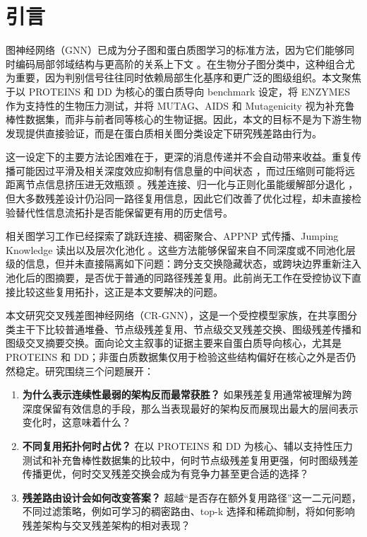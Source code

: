 \section{引言}

图神经网络（GNN）已成为分子图和蛋白质图学习的标准方法，因为它们能够同时编码局部邻域结构与更高阶的关系上下文 \cite{kipf2016semi,gilmer2017neural,hamilton2017inductive,wu2020comprehensive,zhou2020graph}。在生物分子图分类中，这种组合尤为重要，因为判别信号往往同时依赖局部生化基序和更广泛的图级组织。本文聚焦于以 PROTEINS 和 DD 为核心的蛋白质导向 benchmark 设定，将 ENZYMES 作为支持性的生物压力测试，并将 MUTAG、AIDS 和 Mutagenicity 视为补充鲁棒性数据集，而非与前者同等核心的生物证据。因此，本文的目标不是为下游生物发现提供直接验证，而是在蛋白质相关图分类设定下研究残差路由行为。

这一设定下的主要方法论困难在于，更深的消息传递并不会自动带来收益。重复传播可能因过平滑及相关深度效应抑制有信息量的中间状态 \cite{li2018deeper,oono2020simple,chen2023revisiting}，而过压缩则可能将远距离节点信息挤压进无效瓶颈 \cite{alon2020bottleneck,topping2021understanding}。残差连接、归一化与正则化虽能缓解部分退化 \cite{he2016deep,bresson2017residual,zhao2020pair,cai2021graphnorm,rong2019dropedge,chenSimpleDeepGraph2020}，但大多数残差设计仍沿同一路径复用信息，因此它们改善了优化过程，却未直接检验替代性信息流拓扑是否能保留更有用的历史信号。

相关图学习工作已经探索了跳跃连接、稠密聚合、APPNP 式传播、Jumping Knowledge 读出以及层次化池化 \cite{xu2018representation,klicpera2018combining,gao2019graph,ying2018hierarchical}。这些方法能够保留来自不同深度或不同池化层级的信息，但并未直接隔离如下问题：跨分支交换隐藏状态，或跨块边界重新注入池化后的图摘要，是否优于普通的同路径残差复用。此前尚无工作在受控协议下直接比较这些复用拓扑，这正是本文要解决的问题。

本文研究交叉残差图神经网络（CR-GNN），这是一个受控模型家族，在共享图分类主干下比较普通堆叠、节点级残差复用、节点级交叉残差交换、图级残差传播和图级交叉摘要交换。面向论文主叙事的证据主要来自蛋白质导向核心，尤其是 PROTEINS 和 DD；非蛋白质数据集仅用于检验这些结构偏好在核心之外是否仍然稳定。研究围绕三个问题展开：

\begin{enumerate}
    \item \textbf{为什么表示连续性最弱的架构反而最常获胜？} 如果残差复用通常被理解为跨深度保留有效信息的手段，那么当表现最好的架构反而展现出最大的层间表示变化时，这意味着什么？
    \item \textbf{不同复用拓扑何时占优？} 在以 PROTEINS 和 DD 为核心、辅以支持性压力测试和补充鲁棒性数据集的比较中，何时节点级残差复用更强，何时图级残差传播更优，何时交叉残差交换会成为有竞争力甚至更合适的选择？
    \item \textbf{残差路由设计会如何改变答案？} 超越“是否存在额外复用路径”这一二元问题，不同过滤策略，例如可学习的稠密路由、top-k 选择和稀疏抑制，将如何影响残差架构与交叉残差架构的相对表现？
\end{enumerate}

